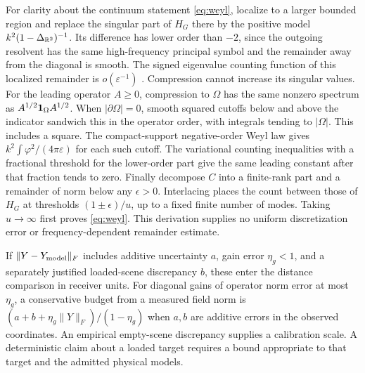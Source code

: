 For clarity about the continuum statement \eqref{eq:weyl}, localize to a larger bounded region and replace the singular part of $H_G$ there by the positive model $k^2(1-\Delta_{\mathbb R^2})^{-1}$. Its difference has lower order than $-2$, since the outgoing resolvent has the same high-frequency principal symbol and the remainder away from the diagonal is smooth. The signed eigenvalue counting function of this localized remainder is $o(\varepsilon^{-1})$ \cite{ponge}. Compression cannot increase its singular values. For the leading operator $A\ge0$, compression to $\Omega$ has the same nonzero spectrum as $A^{1/2}{\bf1}_\Omega A^{1/2}$. When $|\partial\Omega|=0$, smooth squared cutoffs below and above the indicator sandwich this in the operator order, with integrals tending to $|\Omega|$. This includes a square. The compact-support negative-order Weyl law gives $k^2\int\varphi^2/(4\pi\varepsilon)$ for each such cutoff. The variational counting inequalities with a fractional threshold for the lower-order part give the same leading constant after that fraction tends to zero. Finally decompose $C$ into a finite-rank part and a remainder of norm below any $\epsilon>0$. Interlacing places the count between those of $H_G$ at thresholds $(1\pm\epsilon)/u$, up to a fixed finite number of modes. Taking $u\to\infty$ first proves \eqref{eq:weyl}. This derivation supplies no uniform discretization error or frequency-dependent remainder estimate.

If $\|Y-Y_{\rm model}\|_F$ includes additive uncertainty $a$, gain error $\eta_g<1$, and a separately justified loaded-scene discrepancy $b$, these enter the distance comparison in receiver units. For diagonal gains of operator norm error at most $\eta_g$, a conservative budget from a measured field norm is $(a+b+\eta_g\|Y\|_F)/(1-\eta_g)$ when $a,b$ are additive errors in the observed coordinates. An empirical empty-scene discrepancy supplies a calibration scale. A deterministic claim about a loaded target requires a bound appropriate to that target and the admitted physical models.

